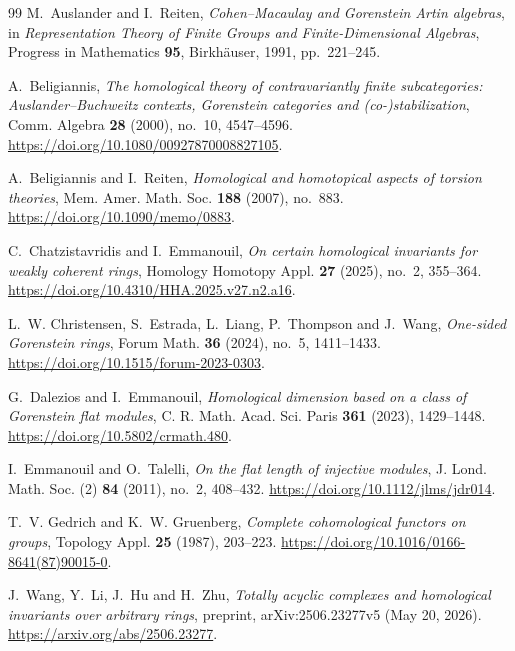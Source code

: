 \documentclass[11pt]{amsart}
\theoremstyle{definition}
\theoremstyle{remark}
\begin{document}
\begin{thebibliography}{99}
M.~Auslander and I.~Reiten,
\emph{Cohen--Macaulay and Gorenstein Artin algebras},
in \emph{Representation Theory of Finite Groups and Finite-Dimensional Algebras},
Progress in Mathematics \textbf{95}, Birkh\"auser, 1991, pp.~221--245.

A.~Beligiannis,
\emph{The homological theory of contravariantly finite subcategories: Auslander--Buchweitz contexts, Gorenstein categories and (co-)stabilization},
Comm. Algebra \textbf{28} (2000), no.~10, 4547--4596.
\url{https://doi.org/10.1080/00927870008827105}.

A.~Beligiannis and I.~Reiten,
\emph{Homological and homotopical aspects of torsion theories},
Mem. Amer. Math. Soc. \textbf{188} (2007), no.~883.
\url{https://doi.org/10.1090/memo/0883}.

C.~Chatzistavridis and I.~Emmanouil,
\emph{On certain homological invariants for weakly coherent rings},
Homology Homotopy Appl. \textbf{27} (2025), no.~2, 355--364.
\url{https://doi.org/10.4310/HHA.2025.v27.n2.a16}.

L.~W. Christensen, S.~Estrada, L.~Liang, P.~Thompson and J.~Wang,
\emph{One-sided Gorenstein rings},
Forum Math. \textbf{36} (2024), no.~5, 1411--1433.
\url{https://doi.org/10.1515/forum-2023-0303}.


G.~Dalezios and I.~Emmanouil,
\emph{Homological dimension based on a class of Gorenstein flat modules},
C. R. Math. Acad. Sci. Paris \textbf{361} (2023), 1429--1448.
\url{https://doi.org/10.5802/crmath.480}.

I.~Emmanouil and O.~Talelli,
\emph{On the flat length of injective modules},
J. Lond. Math. Soc. (2) \textbf{84} (2011), no.~2, 408--432.
\url{https://doi.org/10.1112/jlms/jdr014}.

T.~V. Gedrich and K.~W. Gruenberg,
\emph{Complete cohomological functors on groups},
Topology Appl. \textbf{25} (1987), 203--223.
\url{https://doi.org/10.1016/0166-8641(87)90015-0}.

J.~Wang, Y.~Li, J.~Hu and H.~Zhu,
\emph{Totally acyclic complexes and homological invariants over arbitrary rings},
preprint, arXiv:2506.23277v5 (May 20, 2026).
\url{https://arxiv.org/abs/2506.23277}.

\end{thebibliography}
\end{document}
